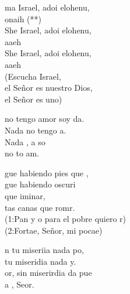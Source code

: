 \documentclass[12pt]{article}
\begin{document}
\begin{multicols*}{2}
\begin{cancion}%
	ma Israel, adoi elohenu, \\
	onaih (**)\\
	She Israel, adoi elohenu, \\
	aaeh\\
	She Israel, adoi elohenu, \\
	aaeh\\
(Escucha Israel, \\
 el Señor es nuestro Dios, \\
 el Señor es uno)\\
\end{cancion}%

\begin{cancion}%
	 no tengo amor  soy da.\\
	Nada   no tengo a.\\
	Nada , a so\\
	 no to am.\\
\end{cancion}%

\begin{cancion}%
	gue habiendo  pies que ,\\
	gue habiendo oscuri\\
	que iminar,\\
	tas canas que romr.\\
	(1:Pan y o para el pobre quiero r)\\
	(2:Fortae, Señor, mi pocae)\\
\end{cancion}%

\begin{cancion}%
	n tu miseriia nada po, \\
	 tu miseridia nada y.\\
	or, sin  miserirdia da pue \\
	a , Seor.\\
\end{cancion}%


\end{multicols*}
\end{document}
